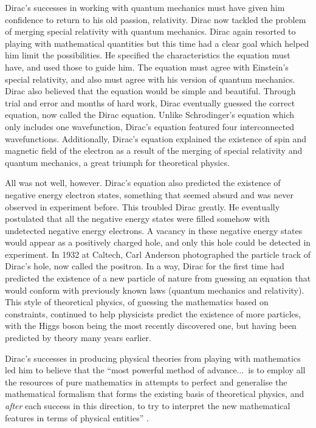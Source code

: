 \documentclass[12pt, oneside, letterpaper, fleqn]{article}
\begin{document}
Dirac's successes in working with quantum mechanics must have given him
confidence to return to his old passion, relativity. Dirac now tackled
the problem of merging special relativity with quantum mechanics. Dirac
again resorted to playing with mathematical quantities but this time had
a clear goal which helped him limit the possibilities. He specified the
characteristics the equation must have, and used those to guide him. The
equation must agree with Einstein's special relativity, and also must
agree with his version of quantum mechanics. Dirac also believed that
the equation would be simple and beautiful. Through trial and error and
months of hard work, Dirac eventually guessed the correct equation, now
called the Dirac equation. Unlike Schrodinger's equation which only
includes one wavefunction, Dirac's equation featured four interconnected
wavefunctions. Additionally, Dirac's equation explained the existence of
spin and magnetic field of the electron as a result of the merging of
special relativity and quantum mechanics, a great triumph for
theoretical physics.

All was not well, however. Dirac's equation also predicted the existence
of negative energy electron states, something that seemed absurd and was
never observed in experiment before. This troubled Dirac greatly. He
eventually postulated that all the negative energy states were filled
somehow with undetected negative energy electrons. A vacancy in these
negative energy states would appear as a positively charged hole, and
only this hole could be detected in experiment. In 1932 at Caltech, Carl
Anderson photographed the particle track of Dirac's hole, now called the
positron. In a way, Dirac for the first time had predicted the existence
of a new particle of nature from guessing an equation that would conform
with previously known laws (quantum mechanics and relativity). This
style of theoretical physics, of guessing the mathematics based on
constraints, continued to help physicists predict the existence of more
particles, with the Higgs boson being the most recently discovered one,
but having been predicted by theory many years earlier.

Dirac's successes in producing physical theories from playing with
mathematics led him to believe that the ``most powerful method of
advance...\ is to employ all the resources of pure mathematics in
attempts to perfect and generalise the mathematical formalism that forms
the existing basis of theoretical physics, and \emph{after} each success
in this direction, to try to interpret the new mathematical features in
terms of physical entities'' \cite{monopoles}.
\end{document}
